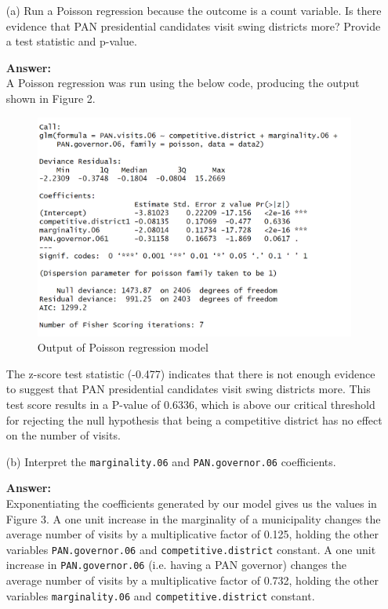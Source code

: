 \documentclass[12pt,letterpaper]{article}
\begin{document}
\begin{enumerate}
	\item [(a)]
	Run a Poisson regression because the outcome is a count variable. Is there evidence that PAN presidential candidates visit swing districts more? Provide a test statistic and p-value.
	
	\vspace{.5cm}
	\textbf{Answer:}\\
	
	A Poisson regression was run using the below code, producing the output shown in Figure 2.
	
	 \vspace{.5cm}
	   
	 \vspace{.5cm} 
	 
	 \begin{figure}[H]\centering
	 	\caption{\footnotesize Output of Poisson regression model}
	 	\includegraphics[width=.75\textwidth]{PoissonReg.png}
	 \end{figure} 

	The z-score test statistic (-0.477) indicates that there is not enough evidence to suggest that PAN presidential candidates visit swing districts more. This test score results in a P-value of 0.6336, which is above our critical threshold for rejecting the null hypothesis that being a competitive district has no effect on the number of visits.  

	\item [(b)]
	Interpret the \texttt{marginality.06} and \texttt{PAN.governor.06} coefficients.
	
	\vspace{.5cm}
	\textbf{Answer:}\\
	
	Exponentiating the coefficients generated by our model gives us the values in Figure 3. A one unit increase in the marginality of a municipality changes the average number of visits by a multiplicative factor of 0.125, holding the other variables \texttt{PAN.governor.06} and \texttt{competitive.district} constant. A one unit increase in \texttt{PAN.governor.06} (i.e. having a PAN governor) changes the average number of visits by a multiplicative factor of 0.732, holding the other variables \texttt{marginality.06} and \texttt{competitive.district} constant.
	

\end{enumerate}
\end{document}
